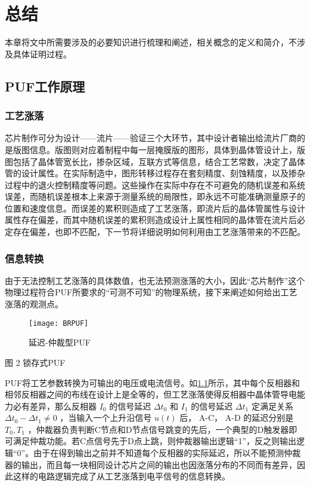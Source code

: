 
\chapter{总结}\label{chap:conclusion}
本章将文中所需要涉及的必要知识进行梳理和阐述，相关概念的定义和简介，不涉及具体证明过程。

\section{PUF工作原理}%
\subsection{工艺涨落}%
芯片制作可分为设计——流片——验证三个大环节，其中设计者输出给流片厂商的是版图信息。版图则对应着制程中每一层掩膜版的图形，具体到晶体管设计上，版图包括了晶体管宽长比，掺杂区域，互联方式等信息，结合工艺常数，决定了晶体管的设计属性。在实际制造中，图形转移过程存在套刻精度、刻蚀精度，以及掺杂过程中的退火控制精度等问题。这些操作在实际中存在不可避免的随机误差和系统误差，而随机误差根本上来源于测量系统的局限性，即永远不可能准确测量原子的位置和速度信息。而误差的累积则造成了工艺涨落，即流片后的晶体管属性与设计属性存在偏差，而其中随机误差的累积则造成设计上属性相同的晶体管在流片后必定存在偏差，也即不匹配，下一节将详细说明如何利用由工艺涨落带来的不匹配。
\subsection{信息转换}
由于无法控制工艺涨落的具体数值，也无法预测涨落的大小，因此``芯片制作''这个物理过程符合PUF所要求的``可测不可知''的物理系统，接下来阐述如何给出工艺涨落的观测点。

\begin{figure}[htb!]
\centering
\texttt{[image: BRPUF]}
\caption{延迟-仲裁型PUF}
\label{fig:arb-puf}
\end{figure}
 
图 2 锁存式PUF

PUF将工艺参数转换为可输出的电压或电流信号。如\ref{fig:arb-puf}所示，其中每个反相器和相邻反相器之间的布线在设计上是全等的，但工艺涨落使得反相器中晶体管导电能力必有差异，那么反相器 $ I_0 $ 的信号延迟 $ \Delta t_0 $ 和 $ I_1 $ 的信号延迟 $ \Delta t_1 $ 定满足关系 $ \Delta t_0-\Delta t_1\neq 0 $ ，当输入一个上升沿信号 $ u(t) $ 后， A-C， A-D 的延迟分别是 $ T_0,T_1 $ ，仲裁器负责判断C节点和D节点信号跳变的先后，一个典型的D触发器即可满足仲裁功能。若C点信号先于D点上跳，则仲裁器输出逻辑``1''，反之则输出逻辑``0''。由于在得到输出之前并不知道每个反相器的实际延迟，所以不能预测仲裁器的输出，而且每一块相同设计芯片之间的输出也因涨落分布的不同而有差异，因此这样的电路逻辑完成了从工艺涨落到电平信号的信息转换。

